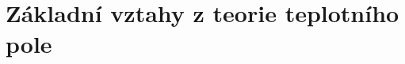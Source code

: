 \chapter{Základní vztahy z teorie teplotního pole}
\label{zakladni_vztahy_z_teorie_teplotniho_pole}
